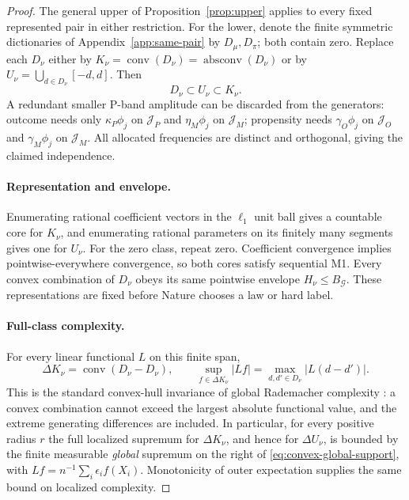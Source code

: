 \begin{proof}
The general upper of Proposition~\ref{prop:upper} applies to every fixed
represented pair in either restriction. For the lower, denote the
finite symmetric dictionaries of Appendix~\ref{app:same-pair} by
$D_\mu,D_\pi$; both contain zero. Replace each $D_\nu$ either by
$K_\nu=\operatorname{conv}(D_\nu)=\operatorname{absconv}(D_\nu)$
or by $U_\nu=\bigcup_{d\in D_\nu}[-d,d]$. Then
\[
 D_\nu\subset U_\nu\subset K_\nu.
\]
A redundant smaller P-band amplitude can be discarded from the
generators: outcome needs only $\kappa_P\phi_j$ on $\mathcal J_P$
and $\eta_M\phi_j$ on $\mathcal J_M$; propensity needs
$\gamma_O\phi_j$ on $\mathcal J_O$ and
$\gamma_M\phi_j$ on $\mathcal J_M$. All allocated frequencies are
distinct and orthogonal, giving the claimed independence.

\paragraph{Representation and envelope.}
Enumerating rational coefficient vectors in the $\ell_1$ unit ball
gives a countable core for $K_\nu$, and enumerating rational parameters
on its finitely many segments gives one for $U_\nu$. For the zero class,
repeat zero. Coefficient
convergence implies pointwise-everywhere convergence, so both cores
satisfy sequential M1. Every convex combination of $D_\nu$ obeys its
same pointwise envelope $H_\nu\le B_{\mathcal G}$. These representations
are fixed before Nature chooses a law or hard label.

\paragraph{Full-class complexity.}
For every linear functional $L$ on this finite span,
\begin{equation}
 \Delta K_\nu=\operatorname{conv}(D_\nu-D_\nu),\qquad
 \sup_{f\in\Delta K_\nu}|Lf|
 =\max_{d,d'\in D_\nu}|L(d-d')|.
 \label{eq:convex-global-support}
\end{equation}
This is the standard convex-hull invariance of global Rademacher
complexity \citep[Theorem 12(2)]{bartlett2002rademacher}:
a convex combination cannot exceed the largest absolute functional
value, and the extreme generating differences are included.
In particular, for every positive radius $r$ the full localized
supremum for $\Delta K_\nu$, and hence for $\Delta U_\nu$, is bounded
by the finite measurable \emph{global} supremum on the right of
\eqref{eq:convex-global-support}, with
$Lf=n^{-1}\sum_i\epsilon_i f(X_i)$.
Monotonicity of outer expectation supplies the same bound on localized
complexity.


\end{proof}
